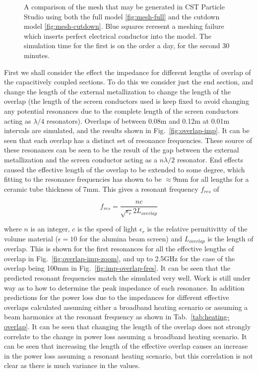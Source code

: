 \begin{figure}
\subfigure[]{
\label{fig:mesh-full}
}
\subfigure[]{
\label{fig:mesh-cutdown}
}
\caption{A comparison of the mesh that may be generated in CST Particle Studio using both the full model \ref{fig:mesh-full} and the cutdown model \ref{fig:mesh-cutdown}. Blue squares reresent a meshing failure which inserts perfect electrical conductor into the model. The simulation time for the first is on the order a day, for the second 30 minutes.}
\label{fig:mki-mesh-com-cst}
\end{figure}

First we shall consider the effect the impedance for different lengths of overlap of the capacitively coupled sections. To do this we consider just the end section, and change the length of the external metallization to change the length of the overlap (the length of the screen conductors used is keep fixed to avoid changing any potential resonances due to the complete length of the screen conductors acting as $\lambda /4$ resonators). Overlaps of between 0.08m and 0.12m at 0.01m intervals are simulated, and the results shown in Fig.~\ref{fig:overlap-imp}. It can be seen that each overlap has a distinct set of resonance frequencies. These source of these resonances can be seen to be the result of the gap between the external metallization and the screen conductor acting as a $n \lambda /2$ resonator. End effects caused the effective length of the overlap to be extended to some degree, which fitting to the resonance frequencies has shown to be $\approx 9$mm for all lengths for a ceramic tube thickness of 7mm. This gives a resonant frequency $f_{res}$ of

\begin{equation}
f_{res} = \frac{nc}{\sqrt{\epsilon_{r}}2 L_{overlap}}
\label{eqn:imp-overlap-fres}
\end{equation}

where $n$ is an integer, $c$ is the speed of light $\epsilon_{r}$ is the relative permitivitty of the volume material ($\epsilon=10$ for the alumina beam screen) and $L_{overlap}$ is the length of overlap. This is shown for the first resonances for all the effective lengths of overlap in Fig.~\ref{fig:overlap-imp-zoom}, and up to 2.5GHz for the case of the overlap being 100mm in Fig.~\ref{fig:imp-overlap-fres}. It can be seen that the predicted resonant frequencies match the simulated very well. Work is still under way as to how to determine the peak impedance of each resonance. In addition predictions for the power loss due to the impedances for different effective overlaps calculated assuming either a broadband heating scenario or assuming a beam harmonics at the resonant frequency as shown in Tab.~\ref{tab:heating-overlap}. It can be seen that changing the length of the overlap does not strongly correlate to the change in power loss assuming a broadband heating scenario. It can be seen that increasing the length of the effective overlap causes an increase in the power loss assuming a resonant heating scenario, but this correlation is not clear as there is much variance in the values.

